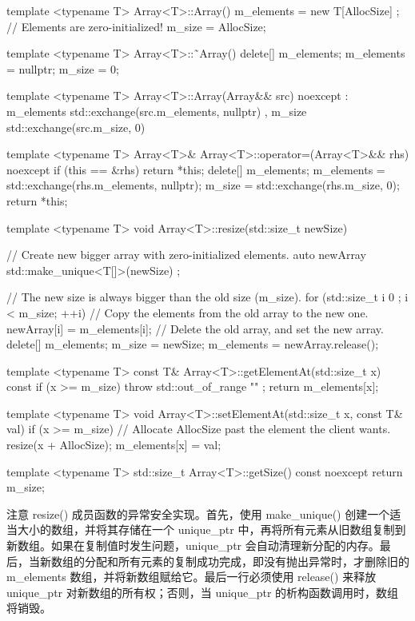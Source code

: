 \begin{cpp}
template <typename T> Array<T>::Array()
{
    m_elements = new T[AllocSize] {}; // Elements are zero-initialized!
    m_size = AllocSize;
}

template <typename T> Array<T>::˜Array()
{
    delete[] m_elements;
    m_elements = nullptr;
    m_size = 0;
}

template <typename T> Array<T>::Array(Array&& src) noexcept
: m_elements { std::exchange(src.m_elements, nullptr) }
, m_size { std::exchange(src.m_size, 0) }
{}

template <typename T> Array<T>& Array<T>::operator=(Array<T>&& rhs) noexcept
{
    if (this == &rhs) { return *this; }
    delete[] m_elements;
    m_elements = std::exchange(rhs.m_elements, nullptr);
    m_size = std::exchange(rhs.m_size, 0);
    return *this;
}

template <typename T> void Array<T>::resize(std::size_t newSize)
{
    // Create new bigger array with zero-initialized elements.
    auto newArray { std::make_unique<T[]>(newSize) };

    // The new size is always bigger than the old size (m_size).
    for (std::size_t i { 0 }; i < m_size; ++i) {
        // Copy the elements from the old array to the new one.
        newArray[i] = m_elements[i];
    }
    // Delete the old array, and set the new array.
    delete[] m_elements;
    m_size = newSize;
    m_elements = newArray.release();
}

template <typename T> const T& Array<T>::getElementAt(std::size_t x) const
{
    if (x >= m_size) { throw std::out_of_range { "" }; }
    return m_elements[x];
}

template <typename T> void Array<T>::setElementAt(std::size_t x, const T& val)
{
    if (x >= m_size) {
        // Allocate AllocSize past the element the client wants.
        resize(x + AllocSize);
    }
    m_elements[x] = val;
}

template <typename T> std::size_t Array<T>::getSize() const noexcept
{
    return m_size;
}
\end{cpp}

注意 resize() 成员函数的异常安全实现。首先，使用 make\_unique() 创建一个适当大小的数组，并将其存储在一个 unique\_ptr 中，再将所有元素从旧数组复制到新数组。如果在复制值时发生问题，unique\_ptr 会自动清理新分配的内存。最后，当新数组的分配和所有元素的复制成功完成，即没有抛出异常时，才删除旧的 m\_elements 数组，并将新数组赋给它。最后一行必须使用 release() 来释放 unique\_ptr 对新数组的所有权；否则，当 unique\_ptr 的析构函数调用时，数组将销毁。

